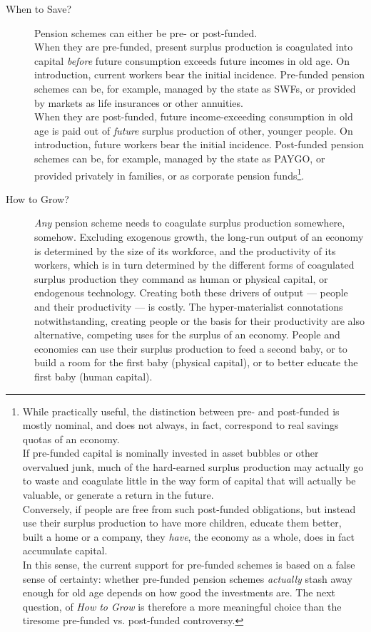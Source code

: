 \documentclass[11pt,a4paper,oneside,openright]{article}
\begin{document}
\begin{description}
	\item[When to Save?] Pension schemes can either be pre- or post-funded. \\
	When they are pre-funded, present surplus production is coagulated into capital \emph{before} future consumption exceeds future incomes in old age. On introduction, current workers bear the initial incidence. Pre-funded pension schemes can be, for example, managed by the state as \glspl{SWF}, or provided by markets as life insurances or other annuities.\\
	When they are post-funded, future income-exceeding consumption in old age is paid out of \emph{future} surplus production of other, younger people. On introduction, future workers bear the initial incidence. Post-funded pension schemes can be, for example, managed by the state as PAYGO, or provided privately in families, or as corporate pension funds\footnote{
		While practically useful, the distinction between pre- and post-funded is mostly nominal, and does not always, in fact, correspond to real savings quotas of an economy. \\
		If pre-funded capital is nominally invested in asset bubbles or other overvalued junk, much of the hard-earned surplus production may actually go to waste and coagulate little in the way form of capital that will actually be valuable, or generate a return in the future. \\
		Conversely, if people are free from such post-funded obligations, but instead use their surplus production to have more children, educate them better, built a home or a company, they \emph{have}, the economy as a whole, does in fact accumulate capital. \\
		In this sense, the current support for pre-funded schemes is based on a false sense of certainty: whether pre-funded pension schemes \emph{actually} stash away enough for old age depends on how good the investments are. The next question, of \emph{How to Grow} is therefore a more meaningful choice than the tiresome pre-funded vs. post-funded controversy.}.\\ 
	\item[How to Grow?] \emph{Any} pension scheme needs to coagulate surplus production somewhere, somehow. Excluding exogenous growth, the long-run output of an economy is determined by the size of its workforce, and the productivity of its workers, which is in turn determined by the different forms of coagulated surplus production they command as human or physical capital, or endogenous technology. Creating both these drivers of output --- people and their productivity --- is costly. The hyper-materialist connotations notwithstanding, creating people or the basis for their productivity are also alternative, competing uses for the surplus of an economy. People and economies can use their surplus production to feed a second baby, or to build a room for the first baby (physical capital), or to better educate the first baby (human capital). \\

\end{description}
\end{document}
